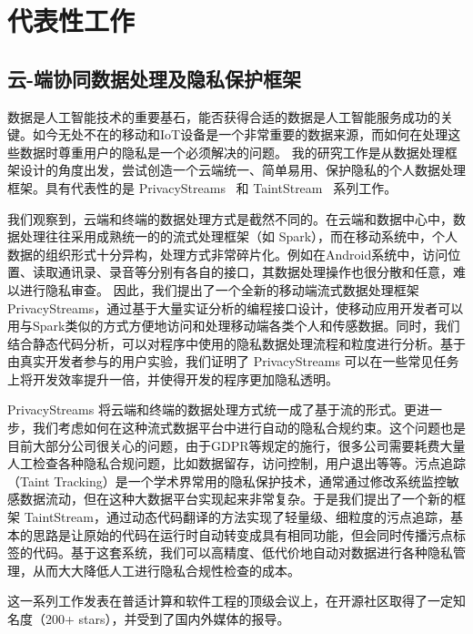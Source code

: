 \documentclass[12pt]{article}
\begin{document}
\section{代表性工作}

\subsection{云-端协同数据处理及隐私保护框架}

数据是人工智能技术的重要基石，能否获得合适的数据是人工智能服务成功的关键。如今无处不在的移动和IoT设备是一个非常重要的数据来源，而如何在处理这些数据时尊重用户的隐私是一个必须解决的问题。
我的研究工作是从数据处理框架设计的角度出发，尝试创造一个云端统一、简单易用、保护隐私的个人数据处理框架。具有代表性的是 PrivacyStreams~\cite{li2017privacystreams} 和 TaintStream~\cite{yang2021taintstream} 系列工作。

我们观察到，云端和终端的数据处理方式是截然不同的。在云端和数据中心中，数据处理往往采用成熟统一的的流式处理框架（如 Spark），而在移动系统中，个人数据的组织形式十分异构，处理方式非常碎片化。例如在Android系统中，访问位置、读取通讯录、录音等分别有各自的接口，其数据处理操作也很分散和任意，难以进行隐私审查。
因此，我们提出了一个全新的移动端流式数据处理框架 PrivacyStreams，通过基于大量实证分析的编程接口设计，使移动应用开发者可以用与Spark类似的方式方便地访问和处理移动端各类个人和传感数据。同时，我们结合静态代码分析，可以对程序中使用的隐私数据处理流程和粒度进行分析。基于由真实开发者参与的用户实验，我们证明了 PrivacyStreams 可以在一些常见任务上将开发效率提升一倍，并使得开发的程序更加隐私透明。

PrivacyStreams 将云端和终端的数据处理方式统一成了基于流的形式。更进一步，我们考虑如何在这种流式数据平台中进行自动的隐私合规约束。这个问题也是目前大部分公司很关心的问题，由于GDPR等规定的施行，很多公司需要耗费大量人工检查各种隐私合规问题，比如数据留存，访问控制，用户退出等等。污点追踪（Taint Tracking）是一个学术界常用的隐私保护技术，通常通过修改系统监控敏感数据流动，但在这种大数据平台实现起来非常复杂。于是我们提出了一个新的框架 TaintStream，通过动态代码翻译的方法实现了轻量级、细粒度的污点追踪，基本的思路是让原始的代码在运行时自动转变成具有相同功能，但会同时传播污点标签的代码。基于这套系统，我们可以高精度、低代价地自动对数据进行各种隐私管理，从而大大降低人工进行隐私合规性检查的成本。

这一系列工作发表在普适计算和软件工程的顶级会议上，在开源社区取得了一定知名度（200+ stars）\cite{privacystreams:code}，并受到了国内外媒体的报导。

\end{document}
